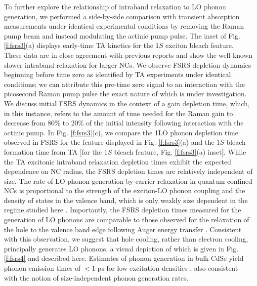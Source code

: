 To further explore the relationship of intraband relaxation to LO phonon generation, we performed a side-by-side comparison with transient absorption measurements under identical experimental conditions by removing the Raman pump beam and instead modulating the actinic pump pulse. The inset of Fig. \ref{f:fsrs3}(a) displays early-time TA kinetics for the $1S$ exciton bleach feature. These data are in close agreement with previous reports \cite{PhysRevB.60.13740, PhysRevB.60.R2181, PhysRevLett.96.057408, PhysRevLett.95.196401, doi:10.1021/jp9944132} and show the well-known slower intraband relaxation for larger NCs. We observe FSRS depletion dynamics beginning before time zero as identified by TA experiments under identical conditions; we can attribute this pre-time zero signal to an interaction with the picosecond Raman pump pulse the exact nature of which is under investigation. We discuss initial FSRS dynamics in the context of a gain depletion time, which, in this instance, refers to the amount of time needed for the Raman gain to decrease from 80\% to 20\% of the initial intensity following interaction with the actinic pump. In Fig. \ref{f:fsrs3}(c), we compare the 1LO phonon depletion time observed in FSRS for the feature displayed in Fig. \ref{f:fsrs3}(a) and the $1S$ bleach formation time from TA [for the $1S$ bleach feature, Fig. \ref{f:fsrs3}(a) inset].  While the TA excitonic intraband relaxation depletion times exhibit the expected dependence on NC radius, the FSRS depletion times are relatively independent of size. The rate of LO phonon generation by carrier relaxation in quantum-confined NCs is proportional to the strength of the exciton-LO phonon coupling and the density of states in the valence band, which is only weakly size dependent in the regime studied here \cite{PhysRevLett.96.057408, PhysRevB.77.235321}.  Importantly, the FSRS depletion times measured for the generation of LO phonons are comparable to those observed for the relaxation of the hole to the valence band edge following Auger energy transfer \cite{PhysRevLett.96.057408, PhysRevB.65.045319}. Consistent with this observation, we suggest that hole cooling, rather than electron cooling, principally generates LO phonons, a visual depiction of which is given in Fig. \ref{f:fsrs4} and described here.  Estimates of phonon generation in bulk CdSe yield phonon emission times of $< 1$ ps for low excitation densities \cite{PhysRevB.50.15461},  also consistent with the notion of size-independent phonon generation rates. \par

